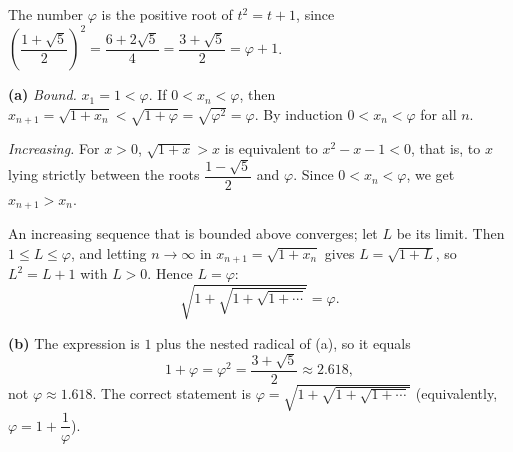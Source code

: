 The number $\varphi$ is the positive root of $t^2=t+1$, since $\left(\dfrac{1+\sqrt5}{2}\right)^2=\dfrac{6+2\sqrt5}{4}=\dfrac{3+\sqrt5}{2}=\varphi+1$.

\textbf{(a)} \emph{Bound.} $x_1=1<\varphi$. If $0<x_n<\varphi$, then $x_{n+1}=\sqrt{1+x_n}<\sqrt{1+\varphi}=\sqrt{\varphi^2}=\varphi$. By induction $0<x_n<\varphi$ for all $n$.

\emph{Increasing.} For $x>0$, $\sqrt{1+x}>x$ is equivalent to $x^2-x-1<0$, that is, to $x$ lying strictly between the roots $\dfrac{1-\sqrt5}{2}$ and $\varphi$. Since $0<x_n<\varphi$, we get $x_{n+1}>x_n$.

An increasing sequence that is bounded above converges; let $L$ be its limit. Then $1\le L\le\varphi$, and letting $n\to\infty$ in $x_{n+1}=\sqrt{1+x_n}$ gives $L=\sqrt{1+L}$, so $L^2=L+1$ with $L>0$. Hence $L=\varphi$:
\[
\sqrt{1+\sqrt{1+\sqrt{1+\cdots}}}=\varphi .
\]

\textbf{(b)} The expression is $1$ plus the nested radical of (a), so it equals
\[
1+\varphi=\varphi^2=\boxed{\dfrac{3+\sqrt5}{2}}\approx2.618 ,
\]
not $\varphi\approx1.618$. The correct statement is $\varphi=\sqrt{1+\sqrt{1+\sqrt{1+\cdots}}}$ (equivalently, $\varphi=1+\dfrac{1}{\varphi}$).
